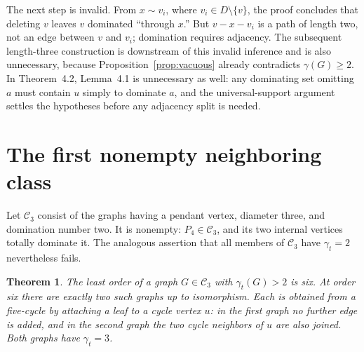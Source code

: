 \documentclass[11pt]{article}
\newtheorem{theorem}{Theorem}
\theoremstyle{remark}
\begin{document}
The next step is invalid.  From \(x\sim v_i\), where \(v_i\in D\setminus
\{v\}\), the proof concludes that deleting \(v\) leaves \(v\) dominated
``through \(x\).''  But \(v-x-v_i\) is a path of length two, not an edge
between \(v\) and \(v_i\); domination requires adjacency.  The subsequent
length-three construction is downstream of this invalid inference and is also
unnecessary, because Proposition~\ref{prop:vacuous} already contradicts
\(\gamma(G)\geq2\).  In Theorem~4.2, Lemma~4.1 is unnecessary as well: any
dominating set omitting \(a\) must contain \(u\) simply to dominate \(a\), and
the universal-support argument settles the hypotheses before any adjacency
split is needed.

\section{The first nonempty neighboring class}

Let \(\mathcal C_3\) consist of the graphs having a pendant vertex, diameter
three, and domination number two.  It is nonempty: \(P_4\in\mathcal C_3\), and
its two internal vertices totally dominate it.  The analogous assertion that
all members of \(\mathcal C_3\) have \(\gamma_t=2\) nevertheless fails.

\begin{theorem}\label{thm:atlas}
The least order of a graph \(G\in\mathcal C_3\) with \(\gamma_t(G)>2\) is six.
At order six there are exactly two such graphs up to isomorphism.  Each is
obtained from a five-cycle by attaching a leaf to a cycle vertex \(u\): in the
first graph no further edge is added, and in the second graph the two cycle
neighbors of \(u\) are also joined.  Both graphs have \(\gamma_t=3\).
\end{theorem}
\end{document}
